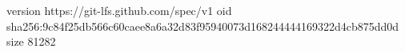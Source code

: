 version https://git-lfs.github.com/spec/v1
oid sha256:9c84f25db566c60caee8a6a32d83f95940073d168244444169322d4cb875dd0d
size 81282
